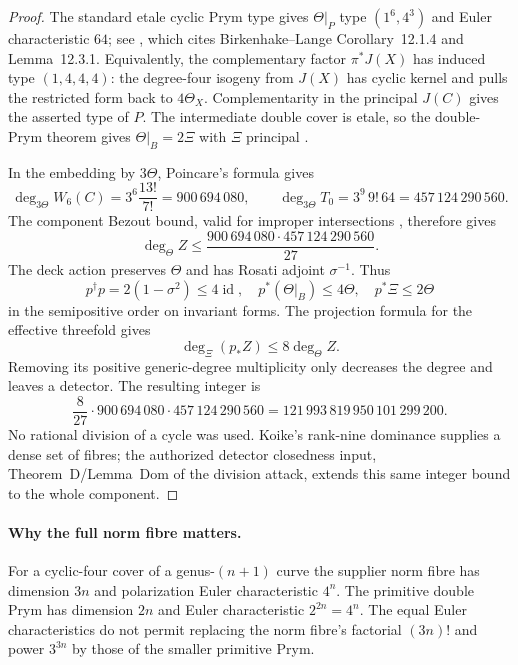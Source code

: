 \begin{proof}
The standard etale cyclic Prym type gives $\Theta|_P$ type
$(1^6,4^3)$ and Euler characteristic $64$; see
\cite[\S4, polarization-type paragraph, author version p.~6]{SF-LangeOrtega2011},
which cites Birkenhake--Lange Corollary~12.1.4 and Lemma~12.3.1.
Equivalently, the complementary factor $\pi^*J(X)$ has induced type
$(1,4,4,4)$: the degree-four isogeny from $J(X)$ has cyclic kernel
and pulls the restricted form back to $4\Theta_X$. Complementarity
in the principal $J(C)$ gives the asserted type of $P$.
The intermediate double cover is etale, so the double-Prym theorem
gives $\Theta|_B=2\Xi$ with $\Xi$ principal
\cite[\S3, Corollary~2 after Corollary~1, p.~332]{SF-Mumford1974}.

In the embedding by $3\Theta$, Poincare's formula gives
\[
 \deg_{3\Theta} W_6(C)=3^6\frac{13!}{7!}=900\,694\,080,
 \qquad
 \deg_{3\Theta} T_0=3^9\,9!\,64=457\,124\,290\,560.
\]
The component Bezout bound, valid for improper intersections
\cite[Example~8.4.6]{SF-Fulton}, therefore gives
\[
 \deg_\Theta Z\le
 \frac{900\,694\,080\cdot457\,124\,290\,560}{27}.
\]
The deck action preserves $\Theta$ and has Rosati adjoint
$\sigma^{-1}$. Thus
\[
 p^\dagger p=2(1-\sigma^2)\le4\operatorname{id},
 \quad p^*(\Theta|_B)\le4\Theta,
 \quad p^*\Xi\le2\Theta
\]
in the semipositive order on invariant forms. The projection formula
for the effective threefold gives
\[
 \deg_\Xi(p_*Z)\le8\deg_\Theta Z.
\]
Removing its positive generic-degree multiplicity only decreases the
degree and leaves a detector. The resulting integer is
\[
 \frac8{27}\cdot900\,694\,080\cdot457\,124\,290\,560
 =121\,993\,819\,950\,101\,299\,200.
\]
No rational division of a cycle was used. Koike's rank-nine dominance
supplies a dense set of fibres; the authorized detector closedness
input, Theorem~D/Lemma~Dom of the division attack, extends this same
integer bound to the whole component.
\end{proof}

\paragraph{Why the full norm fibre matters.}
For a cyclic-four cover of a genus-$(n+1)$ curve the supplier norm
fibre has dimension $3n$ and polarization Euler characteristic $4^n$.
The primitive double Prym has dimension $2n$ and Euler characteristic
$2^{2n}=4^n$. The equal Euler characteristics do not permit replacing
the norm fibre's factorial $(3n)!$ and power $3^{3n}$ by those of
the smaller primitive Prym.

